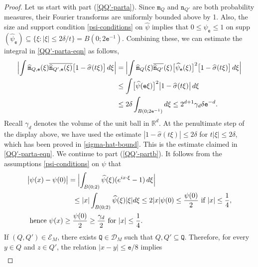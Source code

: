\documentclass[a4paper,11pt]{amsart}
\numberwithin{equation}{section}
\begin{document}
\begin{proof} 
Let us start with part (\ref{QQ'-parta}). Since $\mathtt m_Q$ and $\mathtt n_{Q'}$ are both probability measures, their Fourier transforms are uniformly bounded above by 1. Also, the size and support condition \eqref{psi-conditions} on $\widehat{\psi}$ implies that $0 \leq \widehat{\psi}_{\mathtt e} \leq 1$ on supp$(\widehat{\psi}_{\mathtt e}) \subseteq \{\xi: |\xi| \leq 2\delta/t \} = B(0; 2\mathtt e^{-1})$. Combining these, we can estimate the integral in \eqref{QQ'-parta-eqn} as follows, 
\begin{align*}
\Bigl| \int \widehat{\mathtt m}_{Q, \mathtt e}(\xi) \overline{\widehat{\mathtt n}_{Q', \mathtt e}(\xi)} \bigl[ 1 - \widehat{\sigma}(t \xi) \bigr] \, d\xi \Bigr| &= \Bigl| \int \widehat{\mathtt m}_{Q}(\xi) \overline{\widehat{\mathtt n}_{Q'}}(\xi) \bigl[ \widehat{\psi}_{\mathtt e}(\xi) \bigr]^2 \bigl[ 1 - \widehat{\sigma}(t \xi) \bigr]  \, d\xi \Bigr| \\  &\leq \int \bigl[ \widehat{\psi}(\mathtt e \xi) \bigr]^2 \bigl|1 - \widehat{\sigma}(t \xi) \bigr| \, d\xi \\ &\leq 2\delta \int_{B(0; 2\mathtt e^{-1})} d\xi \leq2^{d+1} \gamma_d \delta \mathtt e^{-d}.  
\end{align*} 
Recall $\gamma_d$ denotes the volume of the unit ball in $\mathbb R^d$. At the penultimate step of the display above, we have used the estimate $|1 - \widehat{\sigma}(t \xi)| \leq 2 \delta$ for $t|\xi| \leq 2 \delta$, which has been proved in \eqref{sigma-hat-bound}.  This is the estimate claimed in \eqref{QQ'-parta-eqn}.
\vskip0.1in  
\noindent We continue to part (\ref{QQ'-partb}). It follows from the assumptions \eqref{psi-conditions} on $\psi$ that 
\begin{align} &\bigl| \psi(x) - \psi(0) \bigr| = \Bigl| \int_{B(0;2)} \widehat{\psi}(\xi) (e^{i x \cdot \xi} - 1) \, d\xi \Bigr| \nonumber \\
& \hskip0.9in \leq |x| \int_{B(0;2)} \widehat{\psi}(\xi) |\xi| d\xi  \leq 2 |x| \psi(0) \leq \frac{\psi(0)}{2} \text{ if } |x| \leq \frac{1}{4}, \nonumber \\
& \text{ hence } \psi(x) \geq \frac{\psi(0)}{2} \geq \frac{\gamma_d}{2}\text{ for } |x| \leq \frac{1}{4}. \label{lower-bound-psi} 
\end{align}
If $(Q, Q') \in \mathscr{E}_M$, there exists $\mathtt Q \in \mathscr{D}_M$ such that $Q, Q' \subseteq \mathtt Q$. Therefore,  for every  $y \in Q$ and  $z \in Q'$, the relation $|x - y| \leq \mathtt e/8$ implies  
\begin{align*}  

\end{align*}
\end{proof}
\end{document}
